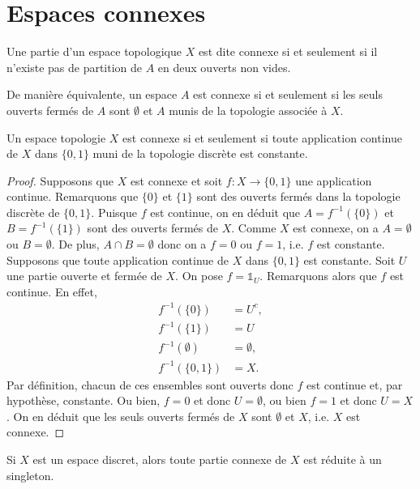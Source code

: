 \documentclass[a4paper]{article}
\begin{document}
\section{Espaces connexes}
\begin{definition} Une partie d'un espace topologique \(X\) est dite connexe si et seulement si il n'existe pas de partition de \(A\) en deux ouverts non vides.
\end{definition}
De manière équivalente, un espace \(A\) est connexe si et seulement si les seuls ouverts fermés de \(A\) sont \(\emptyset\) et \(A\)  munis de la topologie associée à \(X\).
\begin{lemma} Un espace topologie \(X\) est connexe si et seulement si toute application continue de \(X\) dans \(\{0,1\}\) muni de la topologie discrète est constante.
\end{lemma}
\begin{proof} Supposons que \(X\) est connexe et soit \(f:X\to\{0,1\}\) une application continue. Remarquons que \(\{0\}\) et \(\{1\}\) sont des ouverts fermés dans la topologie discrète de \(\{0,1\}\).
    Puisque \(f\) est continue, on en déduit que \(A = f^{-1}(\{0\})\) et \(B = f^{-1}(\{1\})\) sont des ouverts fermés de \(X\). Comme \(X\) est connexe, on a \(A = \emptyset\) ou \(B = \emptyset\). De plus, \(A\cap B = \emptyset\) donc on a \(f = 0\) ou \(f = 1\), i.e. \(f\) est constante.\\

    Supposons que toute application continue de \(X\) dans \(\{0,1\}\) est constante. Soit \(U\) une partie ouverte et fermée de \(X\). On pose \(f = \mathbb{1}_U\). Remarquons alors que \(f\) est continue.
    En effet,
    \begin{align}
        f^{-1}(\{0\}) &= U^c,\\
        f^{-1}(\{1\}) &= U\\
        f^{-1}(\emptyset) &= \emptyset,\\
        f^{-1}(\{0,1\}) &= X.
    \end{align}
    Par définition, chacun de ces ensembles sont ouverts donc \(f\) est continue et, par hypothèse, constante.
    Ou bien, \(f = 0\) et donc \(U = \emptyset\), ou bien \(f = 1\) et donc \(U = X\). On en déduit que les seuls ouverts fermés de \(X\) sont \(\emptyset\) et \(X\), i.e. \(X\) est connexe.
\end{proof}
\begin{example} Si \(X\) est un espace discret, alors toute partie connexe de \(X\) est réduite à un singleton.
\end{example}
\end{document}
